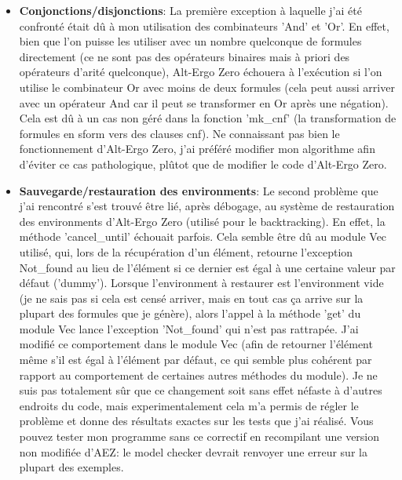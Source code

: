 \documentclass[a4paper]{article}%
\begin{document}
	\begin{itemize}
		\item \textbf{Conjonctions/disjonctions}: La première exception à laquelle j'ai été confronté était dû à mon utilisation des combinateurs
		'And' et 'Or'. En effet, bien que l'on puisse les utiliser avec un nombre quelconque de formules directement
		(ce ne sont pas des opérateurs binaires mais à priori des opérateurs d'arité quelconque),
		Alt-Ergo Zero échouera à l'exécution si l'on utilise le combinateur Or avec moins de deux formules
		(cela peut aussi arriver avec un opérateur And car il peut se transformer en Or après une négation).
		Cela est dû à un cas non géré dans la fonction 'mk\_cnf' (la transformation de formules en sform vers des clauses cnf).
		Ne connaissant pas bien le fonctionnement d'Alt-Ergo Zero, j'ai préféré modifier mon algorithme afin d'éviter ce cas pathologique,
		plûtot que de modifier le code d'Alt-Ergo Zero.\\
		\item \textbf{Sauvegarde/restauration des environments}: Le second problème que j'ai rencontré s'est trouvé être
		lié, après débogage, au système de restauration des environments d'Alt-Ergo Zero (utilisé pour le backtracking).
		En effet, la méthode 'cancel\_until' échouait parfois. Cela semble être dû au module Vec utilisé, qui, lors de la récupération d'un élément,
		retourne l'exception Not\_found au lieu de l'élément si ce dernier est égal à une certaine valeur par défaut ('dummy').
		Lorsque l'environment à restaurer est l'environment vide (je ne sais pas si cela est censé arriver, mais en tout cas ça arrive sur la plupart des formules que je génère),
		alors l'appel à la méthode 'get' du module Vec lance l'exception 'Not\_found' qui n'est pas rattrapée.
		J'ai modifié ce comportement dans le module Vec (afin de retourner l'élément même s'il est égal à l'élément par défaut,
		ce qui semble plus cohérent par rapport au comportement de certaines autres méthodes du module).
		Je ne suis pas totalement sûr que ce changement soit sans effet néfaste à d'autres endroits du code, mais experimentalement cela m'a permis de régler
		le problème et donne des résultats exactes sur les tests que j'ai réalisé.
		Vous pouvez tester mon programme sans ce correctif en recompilant une version non modifiée d'AEZ: le model checker devrait renvoyer une erreur sur la plupart des exemples.
	\end{itemize}
		
\end{document}
